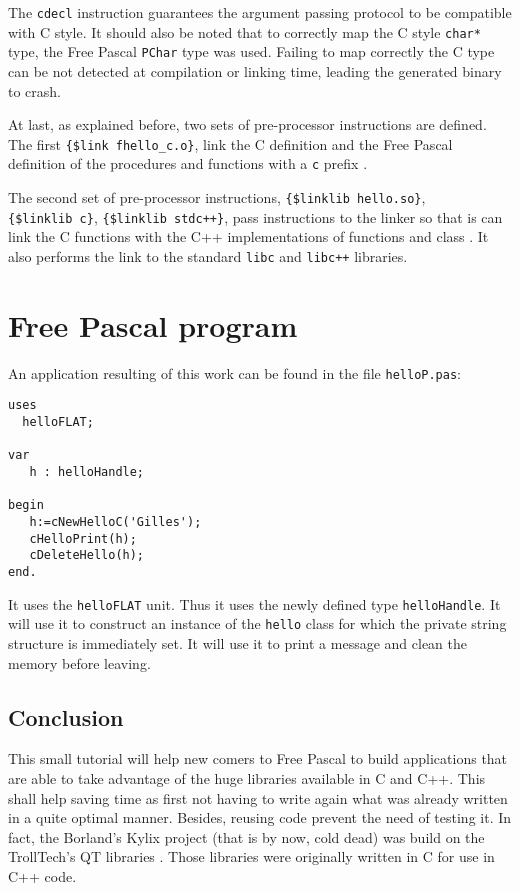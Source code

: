 \documentclass[A4paper]{article}
\begin{document}
The \verb|cdecl| instruction guarantees the argument passing protocol to be
compatible with C style. It should also be noted that to correctly map the
C style \verb|char*| type, the Free Pascal \verb|PChar| type was
used. Failing to map correctly the C type can be not detected at compilation
or linking time, leading the generated binary to crash.

At last, as explained before, two sets of pre-processor instructions are
defined. The first \verb|{$link fhello_c.o}|,%
 link the C definition and the
Free Pascal definition of the procedures and functions with a \verb|c| prefix
\cite{FPDoc,FPFor}.

The second set of pre-processor instructions, \verb|{$linklib hello.so}|,%
\\\verb|{$linklib c}|,%
 \verb|{$linklib stdc++}|,%
 pass instructions to the
linker so that is can link the C functions with the C++ implementations of
functions and class \cite{FPFor,FPDoc}. It also performs the link to the
standard \verb|libc| and \verb|libc++| libraries.

\section{Free Pascal program}

An application resulting of this work can be found in the file
\verb|helloP.pas|:

\begin{verbatim}
uses
  helloFLAT;

var
   h : helloHandle;

begin
   h:=cNewHelloC('Gilles');
   cHelloPrint(h);
   cDeleteHello(h);
end.
\end{verbatim}

It uses the \verb|helloFLAT| unit. Thus it uses the newly defined type
\verb|helloHandle|. It will use it to construct an instance of the
\verb|hello| class for which the private string structure is immediately
set. It will use it to print a message and clean the memory before leaving.

\subsection{Conclusion}

This small tutorial will help new comers to Free Pascal to build applications
that are able to take advantage of the huge libraries available in C and
C++. This shall help saving time as first not having to write again what was
already written in a quite optimal manner. Besides, reusing code prevent the
need of testing it. In fact, the Borland's Kylix project (that is by now, cold
dead) was build on the TrollTech's QT libraries \cite{Delphi}. Those libraries
were originally written in C for use in C++ code.
\end{document}
